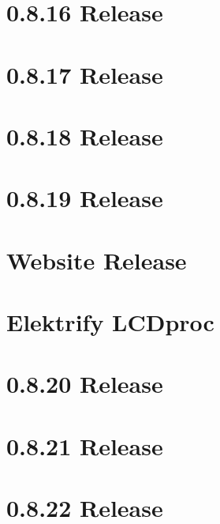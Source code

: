 \documentclass[twoside]{book}
\newcommand{\+}{\discretionary{\mbox{\scriptsize$\hookleftarrow$}}{}{}}
\begin{document}
\chapter{0.8.16 Release}
\label{doc_news_2016-04-29_0_8_16_md}

\chapter{0.8.17 Release}
\label{doc_news_2016-06-14_0_8_17_md}

\chapter{0.8.18 Release}
\label{doc_news_2016-09-17_0_8_18_md}

\chapter{0.8.19 Release}
\label{doc_news_2016-11-22_0_8_19_md}

\chapter{Website Release}
\label{doc_news_2016-12-17_website_release_md}

\chapter{Elektrify L\+C\+Dproc}
\label{doc_news_2017-03-18_lcdproc_md}

\chapter{0.8.20 Release}
\label{doc_news_2017-10-31_0_8_20_md}

\chapter{0.8.21 Release}
\label{doc_news_2017-12-22_0_8_21_md}

\chapter{0.8.22 Release}
\label{doc_news_2018-03-27_0_8_22_md}

\end{document}
